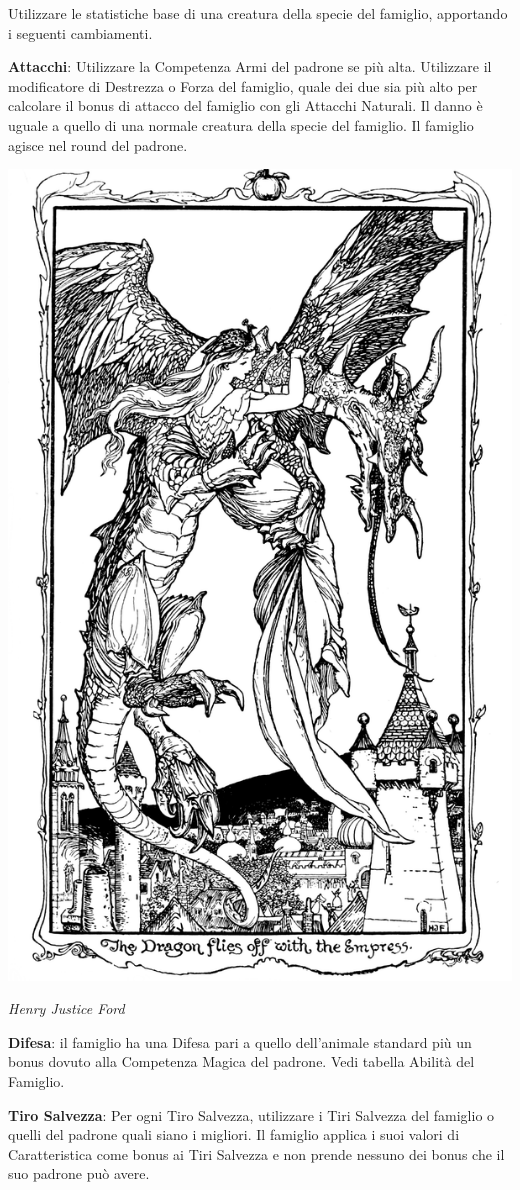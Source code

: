 \begin{multicols}{2}
\bigskip

Utilizzare le statistiche base di una creatura della specie del famiglio, apportando i seguenti cambiamenti.

\medskip

\textbf{Attacchi}: Utilizzare la Competenza Armi del padrone se più alta. Utilizzare il modificatore di Destrezza o Forza del famiglio, quale dei due sia più alto per calcolare il bonus di attacco del famiglio con gli Attacchi Naturali. Il danno è uguale a quello di una normale creatura della specie del famiglio. Il famiglio agisce nel round del padrone.

\medskip

\begin{center}
\includegraphics[width=0.63\linewidth]{immagini/donnadrago2.png}

\emph{Henry Justice Ford}
\end{center}

\medskip

\textbf{Difesa}: il famiglio ha una Difesa pari a quello dell'animale standard più un bonus dovuto alla Competenza Magica del padrone. Vedi tabella Abilità del Famiglio.

\medskip

\textbf{Tiro Salvezza}: Per ogni Tiro Salvezza, utilizzare i Tiri Salvezza del famiglio o quelli del padrone quali siano i migliori. Il famiglio applica i suoi valori di Caratteristica come bonus ai Tiri Salvezza e non prende nessuno dei bonus che il suo padrone può avere.


\end{multicols}
